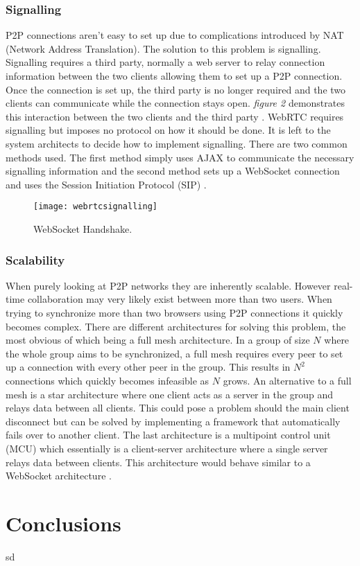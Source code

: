 \documentclass[prodmode,acmtecs]{acmsmall}
\begin{document}
\subsubsection{Signalling}
P2P connections aren't easy to set up due to complications introduced by NAT (Network Address Translation). The solution to this problem is signalling. Signalling requires a third party, normally a web server to relay connection information between the two clients allowing them to set up a P2P connection. Once the connection is set up, the third party is no longer required and the two clients can communicate while the connection stays open. \textit{figure 2} demonstrates this interaction between the two clients and the third party \cite{karadogan2014evaluating}. WebRTC requires signalling but imposes no protocol on how it should be done. It is left to the system architects to decide how to implement signalling. There are two common methods used. The first method simply uses AJAX to communicate the necessary signalling information and the second method sets up a WebSocket connection and uses the Session Initiation Protocol (SIP) \cite{adeyeye2013determining}.

\begin{figure}
\centerline{\texttt{[image: webrtcsignalling]}}
\caption{WebSocket Handshake.}
\label{figure:two}
\end{figure}

\subsubsection{Scalability}
When purely looking at P2P networks they are inherently scalable. However real-time collaboration may very likely exist between more than two users. When trying to synchronize more than two browsers using P2P connections it quickly becomes complex. There are different architectures for solving this problem, the most obvious of which being a full mesh architecture. In a group of size ${N}$ where the whole group aims to be synchronized, a full mesh requires every peer to set up a connection with every other peer in the group. This results in $N^2$ connections which quickly becomes infeasible as $N$ grows. An alternative to a full mesh is a star architecture where one client acts as a server in the group and relays data between all clients. This could pose a problem should the main client disconnect but can be solved by implementing a framework that automatically fails over to another client. The last architecture is a multipoint control unit (MCU) which essentially is a client-server architecture where a single server relays data between clients. This architecture would behave similar to a WebSocket architecture \cite{karadogan2014evaluating}.



\section{Conclusions}

sd
\appendix


\end{document}
